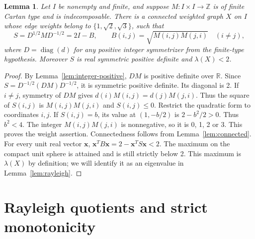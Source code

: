 \documentclass[11pt]{amsart}
\newcommand\ints{{\mathbb Z}}
\newcommand\re{{\mathbb R}}%
\newcommand\Zx{{\mathbf x}}
\newcommand\opk[1]{\mathop{\mathrm{#1}}\nolimits}
\newtheorem{lemma}[theorem]{Lemma}
\theoremstyle{definition}
\begin{document}
\begin{lemma}\label{lem:symmetrization}
Let $I$ be nonempty and finite, and suppose $M:I\times I\to\ints$ is of
finite Cartan type and is indecomposable. There is a connected weighted graph
$X$ on $I$ whose edge weights belong to $\{1,\sqrt2,\sqrt3\}$, such that
\[
 S=D^{1/2}MD^{-1/2}=2I-B,\qquad
 B(i,j)=\sqrt{M(i,j)M(j,i)}\quad(i\ne j),
\]
where $D=\opk{diag}(d)$ for any positive integer symmetrizer from the
finite-type hypothesis. Moreover $S$ is real symmetric positive definite
and $\lambda(X)<2$.
\end{lemma}
\begin{proof}
By Lemma~\ref{lem:integer-positive}, $DM$ is positive definite over $\re$.
Since $S=D^{-1/2}(DM)D^{-1/2}$, it is symmetric positive definite.
Its diagonal is 2. If $i\ne j$, symmetry of $DM$ gives
$d(i)M(i,j)=d(j)M(j,i)$. Thus the square of $S(i,j)$ is
$M(i,j)M(j,i)$ and $S(i,j)\leq0$.
Restrict the quadratic form to coordinates $i,j$. If $S(i,j)=b$, its value
at $(1,-b/2)$ is $2-b^2/2>0$. Thus $b^2<4$.
The integer $M(i,j)M(j,i)$ is nonnegative, so it is 0, 1, 2 or 3.
This proves the weight assertion. Connectedness follows from
Lemma~\ref{lem:connected}. For every unit real vector $\Zx$,
$\Zx^TB\Zx=2-\Zx^TS\Zx<2$. The maximum on the compact unit sphere is
attained and is still strictly below 2. This maximum is $\lambda(X)$
by definition; we will identify it as an eigenvalue in
Lemma~\ref{lem:rayleigh}.
\end{proof}

\section{Rayleigh quotients and strict monotonicity}\label{sec:rayleigh}
\end{document}
